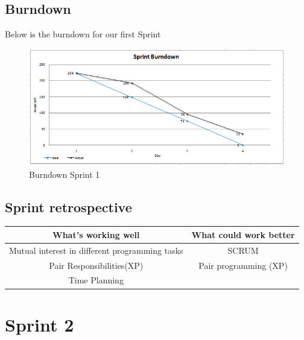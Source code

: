 \subsection{Burndown}
Below is the burndown for our first Sprint
\begin{figure}[h]
\includegraphics[scale=0.7]{img/SCRUM/burndownSprint1.png}
\caption{Burndown Sprint 1}
\label{fig:Burndown Sprint 1}
\end{figure}


\subsection{Sprint retrospective}
\label{sec:retrospective1}
\begin{center}
\begin{tabular}{|c|c|}
\hline \textbf{What's working well} & \textbf{What could work better} \\ 
\hline Mutual interest in different programming tasks & SCRUM \\ 
Pair Responsibilities(XP) & Pair programming (XP) \\ 
 Time Planning &  \\ 
\hline 
\end{tabular} 
\end{center}



\newpage
\section{Sprint 2}
\label{chap:Spring 2}

